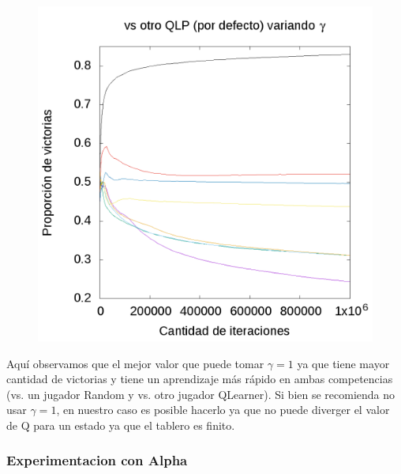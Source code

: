 \documentclass[10pt, a4paper]{article}
\begin{document}
\begin{figure}[H]
\begin{minipage}[c]{1\textwidth}
	\includegraphics[scale=0.2]{GammaQ.png}
  \end{minipage}
\end{figure}

Aquí observamos que el mejor valor que puede tomar $\gamma = 1$ ya que tiene mayor cantidad de victorias y tiene un aprendizaje más rápido en ambas competencias (vs. un jugador Random y vs. otro jugador QLearner). Si bien se recomienda no usar $\gamma = 1$, en nuestro caso es posible hacerlo ya que no puede diverger el valor de Q para un estado ya que el tablero es finito.

\subsubsection{Experimentacion con Alpha}
\end{document}
